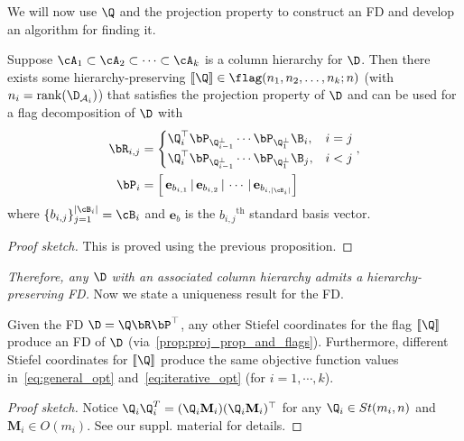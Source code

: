 
We will now use $\Q$ and the projection property to construct an FD and develop an algorithm for finding it.
\begin{prop}\label{prop:proj_prop_and_flags}
 Suppose $\cA_1 \subset \cA_2 \subset \cdots \subset \cA_k$ is a column hierarchy for $\D$. Then there exists some hierarchy-preserving 
 $[\![\Q]\!] \in \flag(n_1,n_2,\dots, n_k;n)$ (with $n_i = \mathrm{rank}(\D_{\mathcal{A}_i})$) 
 that satisfies the projection property of $\D$ and can be used for a flag decomposition of $\D$ with
    \begin{align}
        \bR_{i,j} &= 
        \begin{cases}
            \Q_i^\top\bP_{\Q_{i-1}^\perp}\cdots \bP_{\Q_1^\perp} \B_i, &i=j\\
            \Q_i^\top\bP_{\Q_{i-1}^\perp}\cdots \bP_{\Q_1^\perp} \B_j, &i < j
        \end{cases},\label{eq:onlyR}\\
        \bP_i &= \left[ \,\mathbf{e}_{b_{i,1}}\,|\, \mathbf{e}_{b_{i,2}}\,|\, \cdots\,|\, \mathbf{e}_{b_{i,|\cB_i|}} \right]\label{eq:onlyP}
    \end{align}
    where $\{b_{i,j}\}_{j=1}^{|\cB_i|} = \cB_i$ and $\mathbf{e}_{b}$ is the $b_{i,j}$$^{\mathrm{th}}$ standard basis vector.
\end{prop}
\begin{proof}[Proof sketch]
    This is proved using the previous proposition.
\end{proof}
\emph{Therefore, any $\D$ with an associated column hierarchy admits a hierarchy-preserving FD.} Now we state a uniqueness result for the FD.

\begin{prop}
    Given the FD $\D = \Q \bR \bP^\top$, any other Stiefel coordinates for the flag $[\![\Q]\!]$ produce an FD of $\D$ (via~\cref{prop:proj_prop_and_flags}). Furthermore, different Stiefel coordinates for $[\![\Q]\!]$ produce the same objective function values in~\cref{eq:general_opt} and~\cref{eq:iterative_opt} (for $i=1,\cdots,k$).
\end{prop}
\begin{proof}[Proof sketch]
    Notice $\Q_i \Q_i^T = (\Q_i\mathbf{M}_i)  (\Q_i\mathbf{M}_i)^\top$ for any $\Q_i \in St(m_i,n)$ and $\mathbf{M}_i \in O(m_i)$. See our suppl. material for details.
\end{proof}



